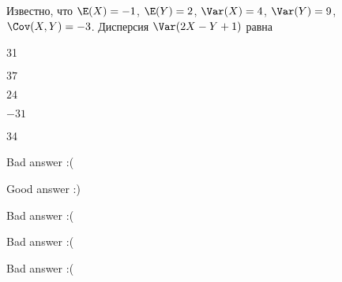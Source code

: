 
\begin{question}
Известно, что \(\E(X)=-1\), \(\E(Y)=2\), \(\Var(X)=4\), \(\Var(Y)=9\),
\(\Cov(X,Y)=-3\). Дисперсия \(\Var(2X-Y+1)\) равна
\begin{answerlist}
  \item 31
  \item \(37\)
  \item \(24\)
  \item \(-31\)
  \item 34
\end{answerlist}
\end{question}

\begin{solution}
\begin{answerlist}
  \item Bad answer :(
  \item Good answer :)
  \item Bad answer :(
  \item Bad answer :(
  \item Bad answer :(
\end{answerlist}
\end{solution}

